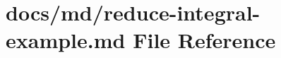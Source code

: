 \hypertarget{reduce-integral-example_8md}{}\section{docs/md/reduce-\/integral-\/example.md File Reference}
\label{reduce-integral-example_8md}
